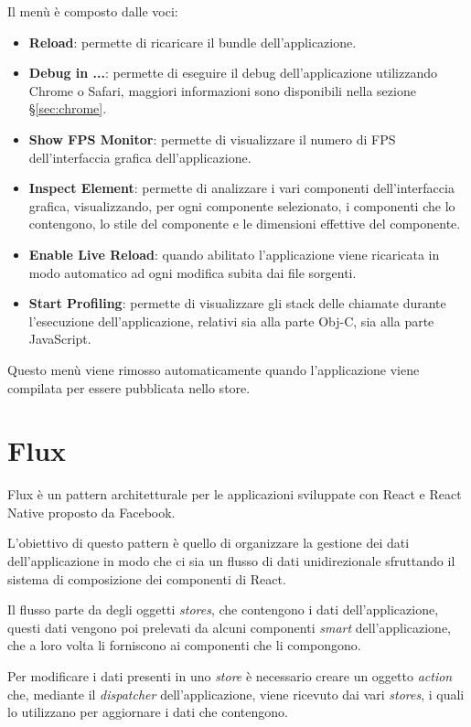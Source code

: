 Il menù è composto dalle voci:
\begin{itemize}
\item \textbf{Reload}: permette di ricaricare il bundle dell'applicazione.
\item \textbf{Debug in ...}: permette di eseguire il debug dell'applicazione utilizzando Chrome o Safari, maggiori informazioni sono disponibili nella sezione §\ref{sec:chrome}.
\item \textbf{Show FPS Monitor}: permette di visualizzare il numero di \gls{FPS} dell'interfaccia grafica dell'applicazione.
\item \textbf{Inspect Element}: permette di analizzare i vari componenti dell'interfaccia grafica, visualizzando, per ogni componente selezionato, i componenti che lo contengono, lo stile del componente e le dimensioni effettive del componente.
\item \textbf{Enable Live Reload}: quando abilitato l'applicazione viene ricaricata in modo automatico ad ogni modifica subita dai file sorgenti.
\item \textbf{Start Profiling}: permette di visualizzare gli stack delle chiamate durante l'esecuzione dell'applicazione, relativi sia alla parte Obj-C, sia alla parte JavaScript. 
\end{itemize}

Questo menù viene rimosso automaticamente quando l'applicazione viene compilata per essere pubblicata nello store.

\section{Flux}\label{sec:flux}
Flux è un pattern architetturale per le applicazioni sviluppate con React e React Native proposto da Facebook.

L'obiettivo di questo pattern è quello di organizzare la gestione dei dati dell'applicazione in modo che ci sia un flusso di dati unidirezionale sfruttando il sistema di composizione dei componenti di React.

Il flusso parte da degli oggetti \textit{stores}, che contengono i dati dell'applicazione, questi dati vengono poi prelevati da alcuni  componenti \textit{smart} dell'applicazione, che a loro volta li forniscono ai componenti che li compongono.

Per modificare i dati presenti in uno \textit{store} è necessario creare un oggetto \textit{action} che, mediante il \textit{dispatcher} dell'applicazione, viene ricevuto dai vari \textit{stores}, i quali lo utilizzano per aggiornare i dati che contengono.

